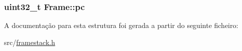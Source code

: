 \subsubsection[{\texorpdfstring{pc}{pc}}]{\setlength{\rightskip}{0pt plus 5cm}uint32\+\_\+t Frame\+::pc}\hypertarget{structFrame_a91e50d2091184efb52b6d7c0c21fd4b2}{}\label{structFrame_a91e50d2091184efb52b6d7c0c21fd4b2}


A documentação para esta estrutura foi gerada a partir do seguinte ficheiro\+:\begin{DoxyCompactItemize}
\item 
src/\hyperlink{framestack_8h}{framestack.\+h}\end{DoxyCompactItemize}

